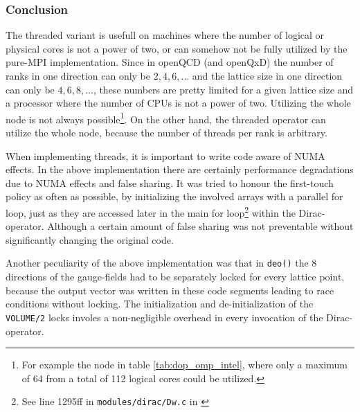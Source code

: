 \documentclass{article}
\theoremstyle{plain} %
\theoremstyle{convention} %
\theoremstyle{remark} %
\def\code#1{\texttt{#1}}
\numberwithin{equation}{section}
\begin{document}
\subsubsection{Conclusion}

The threaded variant is usefull on machines where the number of logical or physical cores is not a power of two, or can somehow not be fully utilized by the pure-MPI implementation. Since in openQCD (and openQxD) the number of ranks in one direction can only be $2,4,6,\dots$ and the lattice size in one direction can only be $4,6,8,\dots$, these numbers are pretty limited for a given lattice size and a processor where the number of CPUs is not a power of two. Utilizing the whole node is not always possible\footnote{For example the node in table \ref{tab:dop_omp_intel}, where only a maximum of \num{64} from a total of \num{112} logical cores could be utilized.}. On the other hand, the threaded operator can utilize the whole node, because the number of threads per rank is arbitrary.

When implementing threads, it is important to write code aware of NUMA effects. In the above implementation there are certainly performance degradations due to NUMA effects and false sharing. It was tried to honour the first-touch policy as often as possible, by initializing the involved arrays with a parallel for loop, just as they are accessed later in the main for loop\footnote{See line 1295ff in \code{modules/dirac/Dw.c} in \cite{openqcd_threads}} within the Dirac-operator. Although a certain amount of false sharing was not preventable without significantly changing the original code.

Another peculiarity of the above implementation was that in \code{deo()} the \num{8} directions of the gauge-fields had to be separately locked for every lattice point, because the output vector was written in these code segments leading to race conditions without locking. The initialization and de-initialization of the \code{VOLUME/2} locks involes a non-negligible overhead in every invocation of the Dirac-operator.
\end{document}
